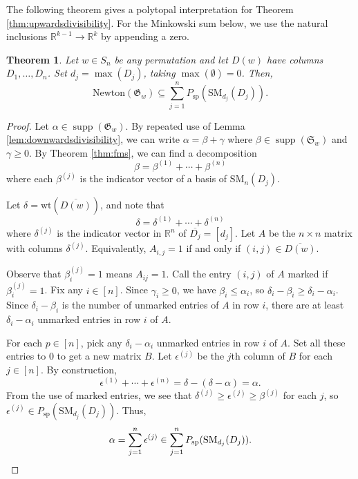 \documentclass{amsart}
\newtheorem{theorem}{Theorem}[section]
\theoremstyle{definition}
\newtheorem{remark}[theorem]{Remark}
\theoremstyle{named}
\DeclareMathOperator{\supp}{supp}
\begin{document}
	The following theorem gives a polytopal interpretation for Theorem \ref{thm:upwardsdivisibility}. 
	For the Minkowski sum below, we use the natural inclusions $\mathbb{R}^{k-1}\to \mathbb{R}^k$ by appending a zero. 
	\begin{theorem}
		\label{thm:superset}
		Let $w\in S_n$ be any permutation and let $D(w)$ have columns $D_1,\ldots,D_n$. Set $d_j = \max(D_j)$, taking $\max(\emptyset)=0$. Then,
		\[\mathrm{Newton}(\mathfrak{G}_w) \subseteq \sum_{j=1}^n P_{\mathrm{sp}}(\mathrm{SM}_{d_j}(D_j)).\]
	\end{theorem}
	\begin{proof}
		Let $\alpha\in\supp(\mathfrak{G}_w)$. By repeated use of Lemma \ref{lem:downwardsdivisibility}, we can write $\alpha = \beta+\gamma$ where $\beta\in\supp(\mathfrak{S}_w)$ and $\gamma\geq 0$. By Theorem \ref{thm:fms}, we can find a decomposition 
		\[\beta=\beta^{(1)}+\cdots+\beta^{(n)} \]
		where each $\beta^{(j)}$ is the indicator vector of a basis of $\mathrm{SM}_n(D_j)$.
		
		Let $\delta=\mathrm{wt}(\overline{D(w)})$, and note that
		\[\delta= \delta^{(1)}+\cdots+\delta^{(n)} \]
		where $\delta^{(j)}$ is the indicator vector in $\mathbb{R}^n$ of $\overline{D_j}=[d_j]$. Let $A$ be the $n\times n$ matrix with columns $\delta^{(j)}$. Equivalently, $A_{i,j}=1$ if and only if $(i,j)\in \overline{D(w)}$. 
		
		Observe that $\beta^{(j)}_i=1$ means $A_{ij}=1$. Call the entry $(i,j)$ of $A$ marked if $\beta^{(j)}_{i}=1$. Fix any $i\in[n]$. Since $\gamma_i\geq 0$, we have $\beta_i\leq \alpha_i$, so $\delta_i-\beta_i\geq \delta_i-\alpha_i$. Since $\delta_i-\beta_i$ is the number of unmarked entries of $A$ in row $i$, there are at least $\delta_i-\alpha_i$ unmarked entries in row $i$ of $A$. 
		
		For each $p\in [n]$, pick any $\delta_i-\alpha_i$ unmarked entries in row $i$ of $A$. Set all these entries to 0 to get a new matrix $B$. Let $\epsilon^{(j)}$ be the $j$th column of $B$ for each $j\in [n]$. By construction, 
		\[\epsilon^{(1)}+\cdots +\epsilon^{(n)} = \delta-(\delta-\alpha)=\alpha. \]
		From the use of marked entries, we see that $\delta^{(j)}\geq \epsilon^{(j)}\geq\beta^{(j)}$ for each $j$, so $\epsilon^{(j)} \in P_{\mathrm{sp}}(\mathrm{SM}_{d_j}(D_j))$.
		Thus,
		\[\alpha = \sum_{j=1}^n \epsilon^{(j)} \in \sum_{j=1}^n P_{\mathrm{sp}}(\mathrm{SM}_{d_j}(D_j)). \qedhere \]
	\end{proof}

	
\end{document}
